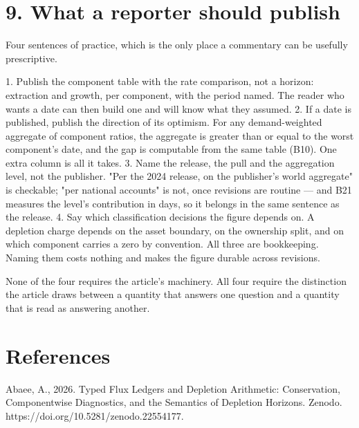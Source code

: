 \documentclass[11pt]{article}
\begin{document}
\vspace{0.8em}

\vspace{0.8em}

\section*{9. What a reporter should publish}\label{9-what-a-reporter-should-publish}

Four sentences of practice, which is the only place a commentary can be usefully prescriptive.

1. Publish the component table with the rate comparison, not a horizon: extraction and growth, per component, with the period named. The reader who wants a date can then build one and will know what they assumed. 2. If a date is published, publish the direction of its optimism. For any demand-weighted aggregate of component ratios, the aggregate is greater than or equal to the worst component's date, and the gap is computable from the same table (B10). One extra column is all it takes. 3. Name the release, the pull and the aggregation level, not the publisher. "Per the 2024 release, on the publisher's world aggregate" is checkable; "per national accounts" is not, once revisions are routine --- and B21 measures the level's contribution in days, so it belongs in the same sentence as the release. 4. Say which classification decisions the figure depends on. A depletion charge depends on the asset boundary, on the ownership split, and on which component carries a zero by convention. All three are bookkeeping. Naming them costs nothing and makes the figure durable across revisions.

None of the four requires the article's machinery. All four require the distinction the article draws between a quantity that answers one question and a quantity that is read as answering another.

\vspace{0.8em}

\vspace{0.8em}

\section*{References}\label{references}

Abaee, A., 2026. Typed Flux Ledgers and Depletion Arithmetic: Conservation, Componentwise Diagnostics, and the Semantics of Depletion Horizons. Zenodo. https://doi.org/10.5281/zenodo.22554177.
\end{document}
